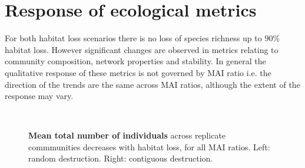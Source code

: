 
\section{Response of ecological metrics}
\label{sec:results}


For both habitat loss scenarios there is no loss of species richness up to $90 \%$ habitat loss. However significant changes are observed in metrics relating to community composition, network properties and stability. In general the qualitative response of these metrics is not governed by MAI ratio i.e. the direction of the trends are the same across MAI ratios, although the extent of the response may vary.

\begin{figure} 
		\centering      
%
        ~

        \caption{\textbf{Mean total number of individuals} across replicate commmunities decreases with habitat loss, for all MAI ratios. Left: random destruction. Right: contiguous destruction.}\label{fig:total_abundance}
\end{figure}

